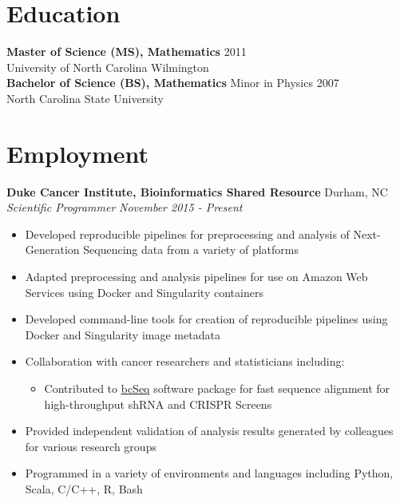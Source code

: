 \documentclass[11pt]{article}
\begin{document}

\section*{Education}

{\bf Master of Science (MS), Mathematics} \hfill 2011\\
University of North Carolina Wilmington
\vspace{5pt}\\
\noindent
{\bf Bachelor of Science (BS), Mathematics} Minor in Physics \hfill 2007\\
North Carolina State University


\section*{Employment}

\noindent
{\bf Duke Cancer Institute, Bioinformatics Shared Resource} \hfill Durham, NC\\
{\it Scientific Programmer} \hfill {\it November 2015 - Present}

\begin{itemize}
\setlength{\itemsep}{1pt}

\item Developed reproducible pipelines for preprocessing
  and analysis of Next-Generation Sequencing data
  from a variety of platforms

\item Adapted preprocessing and analysis pipelines for use on
 Amazon Web Services using Docker and Singularity containers

\item Developed command-line tools for creation of reproducible pipelines
  using Docker and Singularity image metadata

\item Collaboration with cancer researchers and statisticians including:
  \begin{itemize}

    \item Contributed to \href{https://github.com/jl354/bcSeq}{bcSeq} software
    package for fast sequence alignment for high-throughput shRNA and CRISPR Screens

  \end{itemize}

\item Provided independent validation of analysis results generated by colleagues
  for various research groups

\item Programmed in a variety of environments and languages including
 Python, Scala, C/C++, R, Bash

\end{itemize}
\vspace{10pt}
\end{document}
